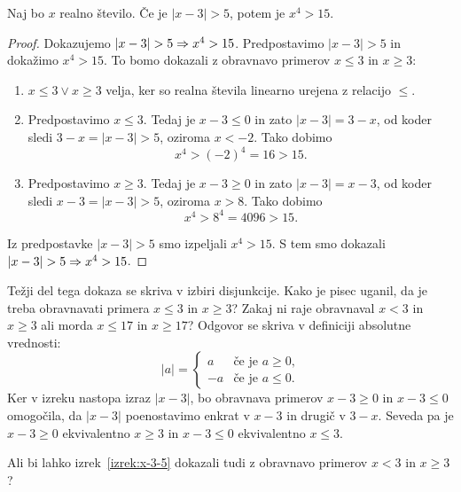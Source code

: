 \begin{izrek}
  \label{izrek:x-3-5}
  Naj bo $x$ realno število. Če je $|x - 3| > 5$, potem je $x^4 > 15$.
\end{izrek}

\begin{proof}
  Dokazujemo $|x - 3| > 5 \Rightarrow x^4 > 15$. Predpostavimo $|x - 3| > 5$
  in dokažimo $x^4 > 15$. To bomo dokazali z obravnavo primerov $x \leq
  3$ in $x \geq 3$:
  \begin{enumerate}
  \item $x \leq 3 \lor x \geq 3$ velja, ker so realna števila linearno
    urejena z relacijo $\leq$.
  \item Predpostavimo $x \leq 3$. Tedaj je $x - 3 \leq 0$ in zato $|x
    - 3| = 3 - x$, od koder sledi $3 - x = |x - 3| > 5$, oziroma $x <
    -2$. Tako dobimo
    \begin{equation*}
      x^4 > (-2)^4 = 16 > 15.
    \end{equation*}
  \item Predpostavimo $x \geq 3$. Tedaj je $x - 3 \geq 0$ in zato $|x -
    3| = x - 3$, od koder sledi $x - 3 = |x - 3| > 5$, oziroma $x >
    8$. Tako dobimo
    \begin{equation*}
      x^4 > 8^4 = 4096 > 15.
    \end{equation*}
  \end{enumerate}
  Iz predpostavke $|x - 3| > 5$ smo izpeljali $x^4 > 15$. S tem smo
  dokazali $|x - 3| > 5 \Rightarrow x^4 > 15$.
\end{proof}

Težji del tega dokaza se skriva v izbiri disjunkcije. Kako je pisec
uganil, da je treba obravnavati primera $x \leq 3$ in $x \geq 3$?
Zakaj ni raje obravnaval $x < 3$ in $x \geq 3$ ali morda $x \leq 17$
in $x \geq 17$? Odgovor se skriva v definiciji absolutne vrednosti:
%
\begin{equation*}
  |a| =
  \begin{cases}
    a & \text{če je $a \geq 0$,}\\
    -a & \text{če je $a \leq 0$.}
  \end{cases}
\end{equation*}
%
Ker v izreku nastopa izraz $|x - 3|$, bo obravnava primerov $x - 3
\geq 0$ in $x - 3 \leq 0$ omogočila, da $|x - 3|$ poenostavimo enkrat
v $x - 3$ in drugič v $3 - x$. Seveda pa je $x - 3 \geq 0$
ekvivalentno $x \geq 3$ in $x - 3 \leq 0$ ekvivalentno $x \leq 3$.

\begin{vaja}
  Ali bi lahko izrek~\ref{izrek:x-3-5} dokazali tudi z obravnavo
  primerov $x < 3$ in $x \geq 3$?
\end{vaja}

